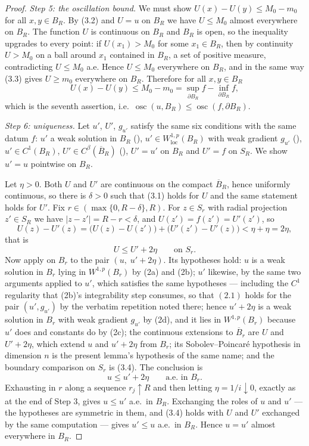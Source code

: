 \begin{proof}
\emph{Step 5: the oscillation bound.}  We must show
$U(x)-U(y)\le M_0-m_0$ for all $x,y\in B_R$.  By (3.2) and $U=u$ on $B_R$ we
have $U\le M_0$ almost everywhere on $B_R$.  The function $U$ is continuous on
$B_R$ and $B_R$ is open, so the inequality upgrades to every point: if
$U(x_1)>M_0$ for some $x_1\in B_R$, then by continuity $U>M_0$ on a ball around
$x_1$ contained in $B_R$, a set of positive measure, contradicting
$U\le M_0$ a.e.  Hence $U\le M_0$ everywhere on $B_R$, and in the same way (3.3)
gives $U\ge m_0$ everywhere on $B_R$.  Therefore for all $x,y\in B_R$
\[
U(x)-U(y)\le M_0-m_0
=\sup_{\partial B_R}f-\inf_{\partial B_R}f ,
\]
which is the seventh assertion, i.e.\
$\operatorname*{osc}(u,B_R)\le\operatorname*{osc}(f,\partial B_R)$.

\emph{Step 6: uniqueness.}  Let $u'$, $U'$, $g_{u'}$ satisfy the same six
conditions with the same datum $f$: $u'$ a weak solution in $B_R$
(\noderef{IsWeakSolutionOn}), $u'\in W^{1,p}_{\mathrm{loc}}(B_R)$ with weak
gradient $g_{u'}$ (\noderef{MemW1pLocOn}), $u'\in C^1(B_R)$,
$U'\in C^\beta(\overline B_R)$ (), $U'=u'$ on $B_R$ and
$U'=f$ on $S_R$.  We show $u'=u$ pointwise on $B_R$.

Let $\eta>0$.  Both $U$ and $U'$ are continuous on the compact $\overline B_R$,
hence uniformly continuous, so there is $\delta>0$ such that (3.1) holds for $U$
and the same statement holds for $U'$.  Fix
$r\in(\max\{0,R-\delta\},R)$.  For $z\in S_r$ with radial projection
$z'\in S_R$ we have $|z-z'|=R-r<\delta$, and $U(z')=f(z')=U'(z')$, so
\[
U(z)-U'(z)=\bigl(U(z)-U(z')\bigr)+\bigl(U'(z')-U'(z)\bigr)<\eta+\eta=2\eta ,
\]
that is
\[
U\le U'+2\eta\qquad\text{on }S_r .
\tag{3.4}
\]
Now apply  on $B_r$ to the pair
$(u,\;u'+2\eta)$.  Its hypotheses hold: $u$ is a weak solution in $B_r$ lying in
$W^{1,p}(B_r)$ by (2a) and (2b); $u'$ likewise, by the same two arguments
applied to $u'$, which satisfies the same hypotheses --- including the $C^1$
regularity that (2b)'s integrability step consumes, so that $(2.1)$ holds for
the pair $(u',g_{u'})$ by the verbatim repetition noted there; hence $u'+2\eta$ is a
weak solution in $B_r$ with weak gradient $g_{u'}$ by (2d), and it lies in
$W^{1,p}(B_r)$ because $u'$ does and constants do by (2c); the continuous
extensions to $\overline B_r$ are $U$ and $U'+2\eta$, which extend $u$ and
$u'+2\eta$ from $B_r$; its Sobolev--Poincar\'e hypothesis
 in dimension $n$ is the present lemma's
hypothesis of the same name; and the boundary comparison on $S_r$ is (3.4).  The
conclusion is
\[
u\le u'+2\eta\qquad\text{a.e.\ in }B_r .
\]
Exhausting in $r$ along a sequence $r_j\uparrow R$ and then letting
$\eta=1/i\downarrow0$, exactly as at the end of Step 3, gives $u\le u'$ a.e.\ in
$B_R$.  Exchanging the roles of $u$ and $u'$ --- the hypotheses are symmetric in
them, and (3.4) holds with $U$ and $U'$ exchanged by the same computation ---
gives $u'\le u$ a.e.\ in $B_R$.  Hence $u=u'$ almost everywhere in $B_R$.


\end{proof}
